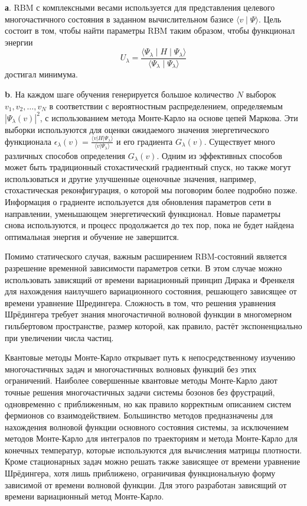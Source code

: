     \textbf{а}. RBM с комплексными весами используется для представления целевого многочастичного состояния в заданном вычислительном базисе $\langle v \mid \Psi \rangle$. Цель состоит в том, чтобы найти параметры RBM таким образом, чтобы функционал энергии \[
    U_{\lambda} = \frac{{\langle \Psi_{\lambda} \mid H \mid \Psi_{\lambda} \rangle}}{{\langle \Psi_{\lambda} \mid \Psi_{\lambda}\rangle}}
    \] достигал минимума. 
    
    \textbf{b}. На каждом шаге обучения генерируется большое количество \(N\) выборок \(v_1, v_2, \ldots, v_N\) в соответствии с вероятностным распределением, определяемым \(|\Psi_\lambda(v)|^2\), с использованием метода Монте-Карло на основе цепей Маркова. Эти выборки используются для оценки ожидаемого значения энергетического функционала \(\epsilon_\lambda(v) = \frac{\langle v | H | \Psi_\lambda \rangle}{\langle v | \Psi_\lambda \rangle}\) и его градиента \(G_\lambda(v)\). Существует много различных способов определения \(G_\lambda(v)\). Одним из эффективных способов может быть традиционный стохастический градиентный спуск, но также могут использоваться и другие улучшенные оценочные значения, например, стохастическая реконфигурация, о которой мы поговорим более подробно позже. Информация о градиенте используется для обновления параметров сети в направлении, уменьшающем энергетический функционал. Новые параметры снова используются, и процесс продолжается до тех пор, пока не будет найдена оптимальная энергия и обучение не завершится.
    \vspace{0,25cm}


    
    Помимо статического случая, важным расширением RBM-состояний является разрешение временной зависимости параметров сетки.
    В этом случае можно использовать зависящий от времени вариационный принцип Дирака и Френкеля для нахождения наилучшего вариационного состояния, решающего зависящее от времени уравнение Шредингера. Сложность в том, что решения уравнения Шрёдингера требует знания многочастичной волновой функции в многомерном гильбертовом пространстве, размер которой, как правило, растёт экспоненциально при увеличении числа частиц.
    
    Квантовые методы Монте-Карло открывает путь к непосредственному изучению многочастичных задач и многочастичных волновых функций без этих ограничений. Наиболее совершенные квантовые методы Монте-Карло дают точные решения многочастичных задачи системы бозонов без фрустраций, одновременно с приближенным, но как правило корректным описанием систем фермионов со взаимодействием. Большинство методов предназначены для нахождения волновой функции основного состояния системы, за исключением методов Монте-Карло для интегралов по траекториям и метода Монте-Карло для конечных температур, которые используются для вычисления матрицы плотности. Кроме стационарных задач можно решать также зависящее от времени уравнение Шрёдингера, хотя лишь приближено, ограничивая функциональную форму зависимой от времени волновой функции. Для этого разработан зависящий от времени вариационный метод Монте-Карло. 
    
